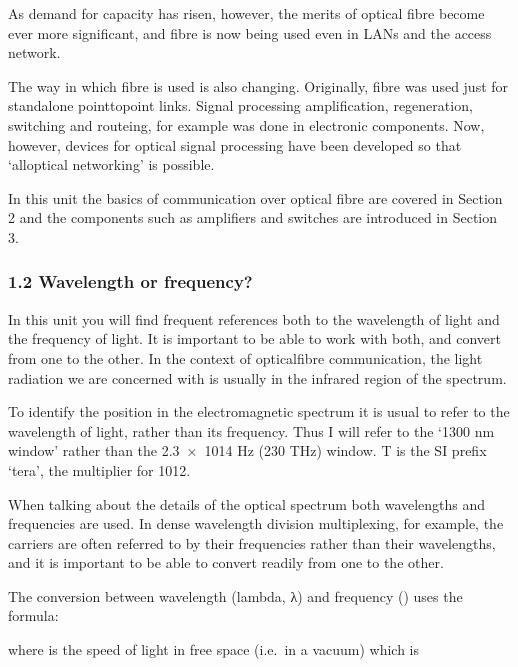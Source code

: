 \documentclass[letterpaper,10pt,english]{sphinxmanual}
\let\sphinxpxdimen\pdfpxdimen\else\newdimen\sphinxpxdimen
\begin{document}
As demand for capacity has risen, however, the merits of optical fibre become ever more significant, and fibre is now being used even in LANs and the access network.

The way in which fibre is used is also changing. Originally, fibre was used just for stand\sphinxhyphen{}alone point\sphinxhyphen{}to\sphinxhyphen{}point links. Signal processing \textendash{} amplification, regeneration, switching and routeing, for example \textendash{} was done in electronic components. Now, however, devices for optical signal processing have been developed so that ‘all\sphinxhyphen{}optical networking’ is possible.

In this unit the basics of communication over optical fibre are covered in Section 2 and the components such as amplifiers and switches are introduced in Section 3.


\subsubsection{1.2 Wavelength or frequency?}
\label{\detokenize{content/session_00/Part_00_01:1.2-Wavelength-or-frequency?}}
In this unit you will find frequent references both to the wavelength of light and the frequency of light. It is important to be able to work with both, and convert from one to the other. In the context of optical\sphinxhyphen{}fibre communication, the light radiation we are concerned with is usually in the infrared region of the spectrum.

To identify the position in the electromagnetic spectrum it is usual to refer to the wavelength of light, rather than its frequency. Thus I will refer to the ‘1300 nm window’ rather than the 2{}.{}3 × 10{}14 Hz (230 THz) window. T is the SI prefix ‘tera’, the multiplier for 1012.

When talking about the details of the optical spectrum both wavelengths and frequencies are used. In dense wavelength division multiplexing, for example, the carriers are often referred to by their frequencies rather than their wavelengths, and it is important to be able to convert readily from one to the other.

The conversion between wavelength (lambda, λ) and frequency () uses the formula:

\sphinxincludegraphics[width=511\sphinxpxdimen,height=219\sphinxpxdimen]{{t305_ue001i}.gif}

where  is the speed of light in free space (i.e. in a vacuum) which is
\end{document}
